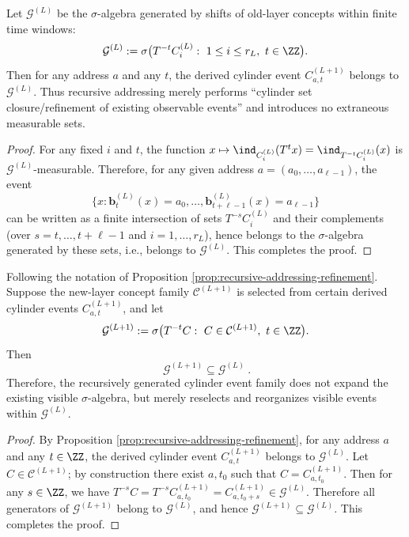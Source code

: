 \begin{proposition}\label{prop:recursive-addressing-refinement}
Let $\mathcal{G}^{(L)}$ be the $\sigma$-algebra generated by shifts of old-layer concepts within finite time windows:
\[
\mathcal{G}^{(L)}:=\sigma\bigl(T^{-t}C_i^{(L)}:\ 1\le i\le r_L,\ t\in\ZZ\bigr).
\]
Then for any address $a$ and any $t$, the derived cylinder event $C^{(L+1)}_{a,t}$ belongs to $\mathcal{G}^{(L)}$. Thus recursive addressing merely performs ``cylinder set closure/refinement of existing observable events'' and introduces no extraneous measurable sets.
\end{proposition}

\begin{proof}
For any fixed \(i\) and \(t\), the function \(x\mapsto \ind_{C_i^{(L)}}(T^t x)=\ind_{T^{-t}C_i^{(L)}}(x)\) is \(\mathcal{G}^{(L)}\)-measurable.
Therefore, for any given address \(a=(a_0,\dots,a_{\ell-1})\), the event
\[
\{x:\mathbf b^{(L)}_t(x)=a_0,\dots,\mathbf b^{(L)}_{t+\ell-1}(x)=a_{\ell-1}\}
\]
can be written as a finite intersection of sets \(T^{-s}C_i^{(L)}\) and their complements (over \(s=t,\dots,t+\ell-1\) and \(i=1,\dots,r_L\)), hence belongs to the \(\sigma\)-algebra generated by these sets, i.e., belongs to \(\mathcal{G}^{(L)}\). This completes the proof.
\end{proof}

\begin{corollary}\label{cor:recursive-addressing-visible-sigma-nonexpansion}
Following the notation of Proposition \ref{prop:recursive-addressing-refinement}.
Suppose the new-layer concept family \(\mathcal{C}^{(L+1)}\) is selected from certain derived cylinder events \(C^{(L+1)}_{a,t}\), and let
\[
\mathcal{G}^{(L+1)}:=\sigma\bigl(T^{-t}C:\ C\in \mathcal{C}^{(L+1)},\ t\in\ZZ\bigr).
\]
Then
\[
\boxed{\ \mathcal{G}^{(L+1)}\subseteq \mathcal{G}^{(L)}\ }.
\]
Therefore, the recursively generated cylinder event family does not expand the existing visible \(\sigma\)-algebra, but merely reselects and reorganizes visible events within \(\mathcal{G}^{(L)}\).
\end{corollary}

\begin{proof}
By Proposition \ref{prop:recursive-addressing-refinement}, for any address \(a\) and any \(t\in\ZZ\), the derived cylinder event \(C^{(L+1)}_{a,t}\) belongs to \(\mathcal{G}^{(L)}\).
Let \(C\in\mathcal{C}^{(L+1)}\); by construction there exist \(a,t_0\) such that \(C=C^{(L+1)}_{a,t_0}\).
Then for any \(s\in\ZZ\), we have \(T^{-s}C=T^{-s}C^{(L+1)}_{a,t_0}=C^{(L+1)}_{a,t_0+s}\in\mathcal{G}^{(L)}\).
Therefore all generators of \(\mathcal{G}^{(L+1)}\) belong to \(\mathcal{G}^{(L)}\), and hence \(\mathcal{G}^{(L+1)}\subseteq \mathcal{G}^{(L)}\). This completes the proof.
\end{proof}

